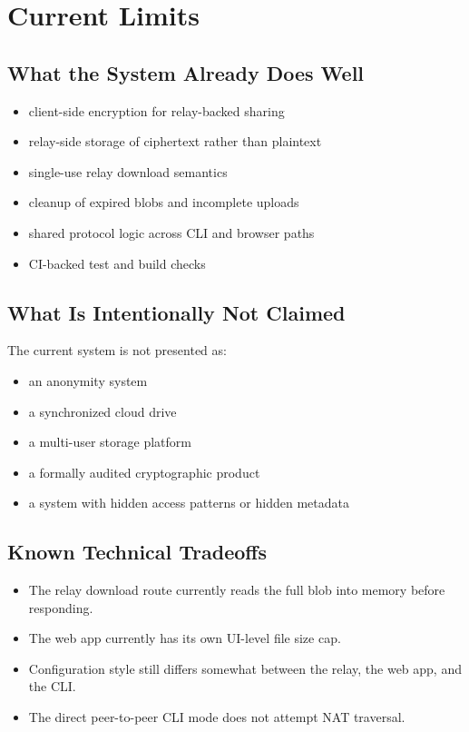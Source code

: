 \documentclass[11pt,a4paper]{report}
\begin{document}
\chapter{Current Limits}

\section{What the System Already Does Well}

\begin{itemize}[leftmargin=1.5cm]
    \item client-side encryption for relay-backed sharing
    \item relay-side storage of ciphertext rather than plaintext
    \item single-use relay download semantics
    \item cleanup of expired blobs and incomplete uploads
    \item shared protocol logic across CLI and browser paths
    \item CI-backed test and build checks
\end{itemize}

\section{What Is Intentionally Not Claimed}

The current system is not presented as:

\begin{itemize}[leftmargin=1.5cm]
    \item an anonymity system
    \item a synchronized cloud drive
    \item a multi-user storage platform
    \item a formally audited cryptographic product
    \item a system with hidden access patterns or hidden metadata
\end{itemize}

\section{Known Technical Tradeoffs}

\begin{itemize}[leftmargin=1.5cm]
    \item The relay download route currently reads the full blob into memory before responding.
    \item The web app currently has its own UI-level file size cap.
    \item Configuration style still differs somewhat between the relay, the web app, and the CLI.
    \item The direct peer-to-peer CLI mode does not attempt NAT traversal.
\end{itemize}
\end{document}
